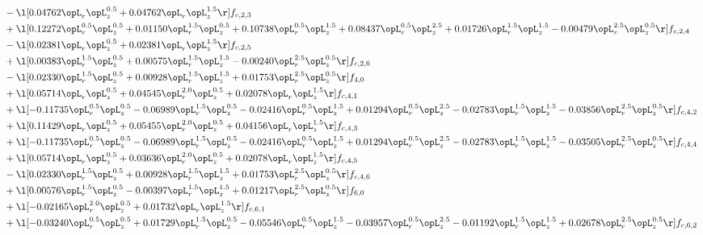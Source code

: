 \begin{alignat}{2}
& - \l[  0.04762 \opL_r \opL_z^{0.5} +  0.04762 \opL_r \opL_z^{1.5}  \r] f_{c,2,3} \nonumber \\ 
& + \l[  0.12272 \opL_r^{0.5} \opL_z^{0.5} +  0.01150 \opL_r^{1.5} \opL_z^{0.5} +  0.10738 \opL_r^{0.5} \opL_z^{1.5} +  0.08437 \opL_r^{0.5} \opL_z^{2.5} +  0.01726 \opL_r^{1.5} \opL_z^{1.5}   -0.00479 \opL_r^{2.5} \opL_z^{0.5}  \r] f_{c,2,4} \nonumber \\ 
& - \l[  0.02381 \opL_r \opL_z^{0.5} +  0.02381 \opL_r \opL_z^{1.5}  \r] f_{c,2,5} \nonumber \\ 
& + \l[  0.00383 \opL_r^{1.5} \opL_z^{0.5} +  0.00575 \opL_r^{1.5} \opL_z^{1.5}   -0.00240 \opL_r^{2.5} \opL_z^{0.5}  \r] f_{c,2,6} \nonumber \\ 
& - \l[  0.02330 \opL_r^{1.5} \opL_z^{0.5} +  0.00928 \opL_r^{1.5} \opL_z^{1.5} +  0.01753 \opL_r^{2.5} \opL_z^{0.5}  \r] f_{4,0} \nonumber \\ 
& + \l[  0.05714 \opL_r \opL_z^{0.5} +  0.04545 \opL_r^{2.0} \opL_z^{0.5} +  0.02078 \opL_r \opL_z^{1.5}  \r] f_{c,4,1} \nonumber \\ 
& + \l[  -0.11735 \opL_r^{0.5} \opL_z^{0.5}   -0.06989 \opL_r^{1.5} \opL_z^{0.5}   -0.02416 \opL_r^{0.5} \opL_z^{1.5} +  0.01294 \opL_r^{0.5} \opL_z^{2.5}   -0.02783 \opL_r^{1.5} \opL_z^{1.5}   -0.03856 \opL_r^{2.5} \opL_z^{0.5}  \r] f_{c,4,2} \nonumber \\ 
& + \l[  0.11429 \opL_r \opL_z^{0.5} +  0.05455 \opL_r^{2.0} \opL_z^{0.5} +  0.04156 \opL_r \opL_z^{1.5}  \r] f_{c,4,3} \nonumber \\ 
& + \l[  -0.11735 \opL_r^{0.5} \opL_z^{0.5}   -0.06989 \opL_r^{1.5} \opL_z^{0.5}   -0.02416 \opL_r^{0.5} \opL_z^{1.5} +  0.01294 \opL_r^{0.5} \opL_z^{2.5}   -0.02783 \opL_r^{1.5} \opL_z^{1.5}   -0.03505 \opL_r^{2.5} \opL_z^{0.5}  \r] f_{c,4,4} \nonumber \\ 
& + \l[  0.05714 \opL_r \opL_z^{0.5} +  0.03636 \opL_r^{2.0} \opL_z^{0.5} +  0.02078 \opL_r \opL_z^{1.5}  \r] f_{c,4,5} \nonumber \\ 
& - \l[  0.02330 \opL_r^{1.5} \opL_z^{0.5} +  0.00928 \opL_r^{1.5} \opL_z^{1.5} +  0.01753 \opL_r^{2.5} \opL_z^{0.5}  \r] f_{c,4,6} \nonumber \\ 
& + \l[  0.00576 \opL_r^{1.5} \opL_z^{0.5}   -0.00397 \opL_r^{1.5} \opL_z^{1.5} +  0.01217 \opL_r^{2.5} \opL_z^{0.5}  \r] f_{6,0} \nonumber \\ 
& + \l[  -0.02165 \opL_r^{2.0} \opL_z^{0.5} +  0.01732 \opL_r \opL_z^{1.5}  \r] f_{c,6,1} \nonumber \\ 
& + \l[  -0.03240 \opL_r^{0.5} \opL_z^{0.5} +  0.01729 \opL_r^{1.5} \opL_z^{0.5}   -0.05546 \opL_r^{0.5} \opL_z^{1.5}   -0.03957 \opL_r^{0.5} \opL_z^{2.5}   -0.01192 \opL_r^{1.5} \opL_z^{1.5} +  0.02678 \opL_r^{2.5} \opL_z^{0.5}  \r] f_{c,6,2} \nonumber \\ 

\end{alignat}
